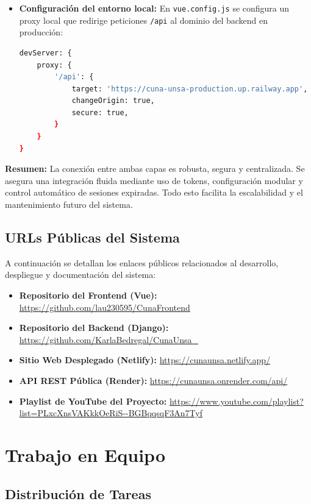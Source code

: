 \documentclass{article}
\begin{document}
\begin{itemize}
    \item \textbf{Configuración del entorno local:} En \texttt{vue.config.js} se configura un proxy local que redirige peticiones \texttt{/api} al dominio del backend en producción:
    \begin{lstlisting}[language=bash]
devServer: {
    proxy: {
        '/api': {
            target: 'https://cuna-unsa-production.up.railway.app',
            changeOrigin: true,
            secure: true,
        }
    }
}
    \end{lstlisting}
\end{itemize}

\textbf{Resumen:} La conexión entre ambas capas es robusta, segura y centralizada. Se asegura una integración fluida mediante uso de tokens, configuración modular y control automático de sesiones expiradas. Todo esto facilita la escalabilidad y el mantenimiento futuro del sistema.



    \subsection{URLs Públicas del Sistema}
    A continuación se detallan los enlaces públicos relacionados al desarrollo, despliegue y documentación del sistema:
    \begin{itemize}
        \item \textbf{Repositorio del Frontend (Vue):} \url{https://github.com/lau230595/CunaFrontend}
        \item \textbf{Repositorio del Backend (Django):} \url{https://github.com/KarlaBedregal/CunaUnsa_}   
        \item \textbf{Sitio Web Desplegado (Netlify):} \url{https://cunaunsa.netlify.app/}
        \item \textbf{API REST Pública (Render):} \url{https://cunaunsa.onrender.com/api/}
        \item \textbf{Playlist de YouTube del Proyecto:} \url{https://www.youtube.com/playlist?list=PLxcXnsVAKkkOeRiS--BGBqqsqF3An7Tyf}
    \end{itemize}
  
\section{Trabajo en Equipo}
    \subsection{Distribución de Tareas}
\end{document}
